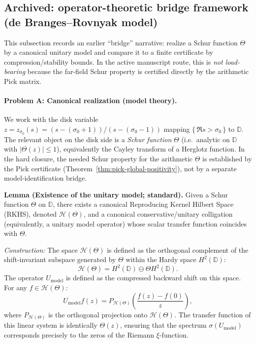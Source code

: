 \documentclass[11pt]{article}
\theoremstyle{definition}
\theoremstyle{remark}
\theoremstyle{definition}
\begin{document}
\subsection*{Archived: operator-theoretic bridge framework (de Branges--Rovnyak model)}

This subsection records an earlier ``bridge'' narrative: realize a Schur function $\Theta$ by a canonical unitary model and compare it to a finite certificate by compression/stability bounds.
In the active manuscript route, this is \emph{not load-bearing} because the far-field Schur property is certified directly by the arithmetic Pick matrix.

\paragraph{Problem A: Canonical realization (model theory).}
We work with the disk variable $z = z_{\sigma_0}(s)=(s-(\sigma_0+1))/(s-(\sigma_0-1))$ mapping $\{\,\Re s>\sigma_0\,\}$ to $\mathbb{D}$. The relevant object on the disk side is a \emph{Schur function} $\Theta$ (i.e.\ analytic on $\mathbb{D}$ with $|\Theta(z)|\le 1$), equivalently the Cayley transform of a Herglotz function.
In the hard closure, the needed Schur property for the arithmetic $\Theta$ is established by the Pick certificate (Theorem~\ref{thm:pick-global-positivity}), not by a separate model-identification bridge.

\textbf{Lemma (Existence of the unitary model; standard).}
Given a Schur function $\Theta$ on $\mathbb{D}$, there exists a canonical Reproducing Kernel Hilbert Space (RKHS), denoted $\mathcal{H}(\Theta)$, and a canonical conservative/unitary colligation (equivalently, a unitary model operator) whose scalar transfer function coincides with $\Theta$.

\textit{Construction:}
The space $\mathcal{H}(\Theta)$ is defined as the orthogonal complement of the shift-invariant subspace generated by $\Theta$ within the Hardy space $H^2(\mathbb{D})$:
\[
    \mathcal{H}(\Theta) = H^2(\mathbb{D}) \ominus \Theta H^2(\mathbb{D}).
\]
The operator $U_{\mathrm{model}}$ is defined as the compressed backward shift on this space. For any $f \in \mathcal{H}(\Theta)$:
\[
    U_{\mathrm{model}} f(z) = P_{\mathcal{H}(\Theta)} \left( \frac{f(z) - f(0)}{z} \right),
\]
where $P_{\mathcal{H}(\Theta)}$ is the orthogonal projection onto $\mathcal{H}(\Theta)$. The transfer function of this linear system is identically $\Theta(z)$, ensuring that the spectrum $\sigma(U_{\mathrm{model}})$ corresponds precisely to the zeros of the Riemann $\xi$-function.
\end{document}
